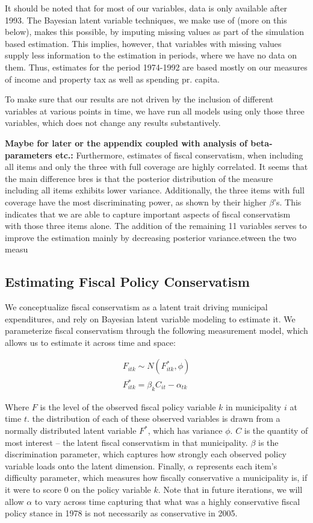 \documentclass[a4paper,11pt]{article}
\begin{document}
It should be noted that for most of our variables, data is only available after 1993. The Bayesian latent variable techniques, we make use of (more on this below), makes this possible, by imputing missing values as part of the simulation based estimation. This implies, however, that variables with missing values supply less information to the estimation in periods, where we have no data on them. Thus, estimates for the period 1974-1992 are based mostly on our measures of income and property tax as well as spending pr. capita. 

To make sure that our results are not driven by the inclusion of different variables at various points in time, we have run all models using only those three variables, which does not change any results substantively. 

\textbf{Maybe for later or the appendix coupled with analysis of beta-parameters etc.:} Furthermore, estimates of fiscal conservatism, when including all items and only the three with full coverage are highly correlated. It seems that the main difference bres is that the posterior distribution of the measure including all items exhibits lower variance. Additionally, the three items with full coverage have the most discriminating power, as shown by their higher $\beta$'s. This indicates that we are able to capture important aspects of fiscal conservatism with those three items alone. The addition of the remaining 11 variables serves to improve the estimation mainly by decreasing posterior variance.etween the two measu

\subsection*{Estimating Fiscal Policy Conservatism}

We conceptualize fiscal conservatism as a latent trait driving municipal expenditures, and rely on Bayesian latent variable modeling to estimate it. We parameterize fiscal conservatism through the following measurement model, which allows us to estimate it across time and space:

\begin{gather*}
F_{itk} \sim N(F^*_{itk}, \phi)\\
F^*_{itk} = \beta_k C_{it} - \alpha_{tk}
\end{gather*}

\noindent Where $F$ is the level of the observed fiscal policy variable $k$ in municipality $i$ at time $t$. the distribution of each of these observed variables is drawn from a normally distributed latent variable $F^*$, which has variance $\phi$. $C$ is the quantity of most interest -- the latent fiscal conservatism in that municipality. $\beta$ is the discrimination parameter, which captures how strongly each observed policy variable loads onto the latent dimension. Finally, $\alpha$ represents each item's difficulty parameter, which measures how fiscally conservative a municipality is, if it were to score 0 on the policy variable $k$. Note that in future iterations, we will allow $\alpha$ to vary across time capturing that what was a highly conservative fiscal policy stance in 1978 is not necessarily as conservative in 2005.
\end{document}
